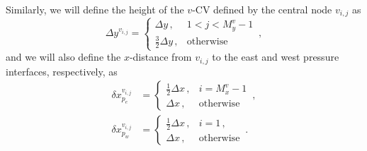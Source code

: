 \documentclass{article}
\begin{document}
Similarly, we will define the height of the $v$-CV defined by the central node $v_{i,j}$ as
\begin{equation}
	\Delta y^{v_{i,j}} = \begin{cases}
		\Delta y \,, & 1 < j < M_y^v - 1 \\
		\frac{3}{2} \Delta y \,, & \text{otherwise}
	\end{cases}\,,
\end{equation}
and we will also define the $x$-distance from $v_{i,j}$ to the east and west pressure interfaces, respectively, as
\begin{subequations}
	\begin{align}
		\delta x^{v_{i,j}}_{p_e} & = \begin{cases}
			\frac{1}{2} \Delta x\,, & i = M_x^v - 1 \\
			\Delta x \,, & \text{otherwise}
		\end{cases}\,, \\
		\delta x^{v_{i,j}}_{p_w} & = \begin{cases}
			\frac{1}{2} \Delta x\,, & i = 1\,, \\
			\Delta x\,, & \text{otherwise}
		\end{cases}\,.
	\end{align}
\end{subequations}
\end{document}
